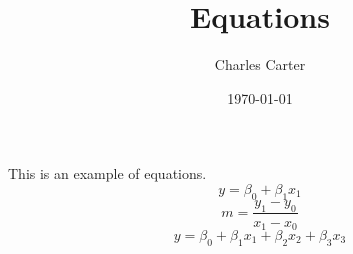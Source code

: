 \documentclass{article}
\title{Equations}
\author{Charles Carter}
\date{\today{}}
\begin{document}
\maketitle{}
This is an example of equations.
\begin{equation}
\label{line}
y = \beta_0 + \beta_1 x_1
\end{equation}
\begin{equation}
\label{slope}
m = \frac{y_1 - y_0}{x_1 - x_0}
\end{equation}
\begin{equation*}
y = \beta_0 + \beta_1 x_1 + \beta_2 x_2 + \beta_3 x_3
\end{equation*}
\end{document}
